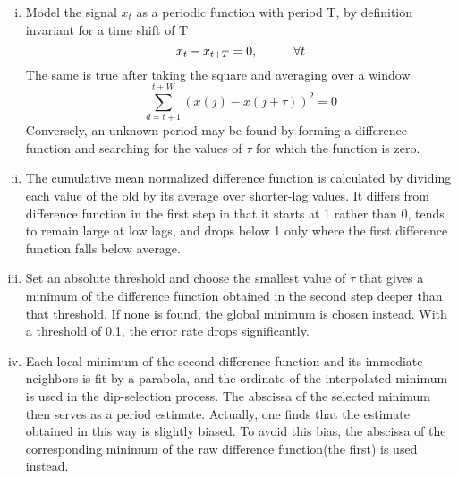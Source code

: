 \begin{enumerate}[(i)]
        \item Model the signal $x_t$ as a periodic function with period T, by definition invariant for a time shift
                of T
                \begin{equation}
                        x_t - x_{t+T} = 0,\hspace{10mm}\forall t
                \end{equation}
                The same is true after taking the square and averaging over a window
                \begin{equation}
                        \sum_{d=t+1}^{t+W}{(x(j)-x(j+\tau))^2} = 0
                \end{equation}
                    Conversely, an unknown period may be found by forming a difference function and searching for 
                    the values of $\tau$ for which the function is zero.
            \item The cumulative mean normalized difference function is calculated by dividing each value of the old 
                    by its average over shorter-lag values. It differs from difference function in the first step in that it 
                    starts at 1 rather than 0, tends to remain large at low lags, and drops below 1 only where the first 
                    difference function falls below average. 
            \item Set an absolute threshold and choose the smallest value of $\tau$ that gives a minimum of the  
                    difference function obtained in the second step deeper than that threshold. If none is found, the 
                    global minimum is chosen instead. With a threshold of 0.1, the error rate drops significantly. 
            \item Each local minimum of the second difference function and its immediate neighbors is fit by a 
                    parabola, and the ordinate of the interpolated minimum is used in the dip-selection process. The 
                    abscissa of the selected minimum then serves as a period estimate. Actually, one finds that the 
                    estimate obtained in this way is slightly biased. To avoid this bias, the abscissa of the corresponding 
                    minimum of the raw difference function(the first) is used instead. 
\end{enumerate}

